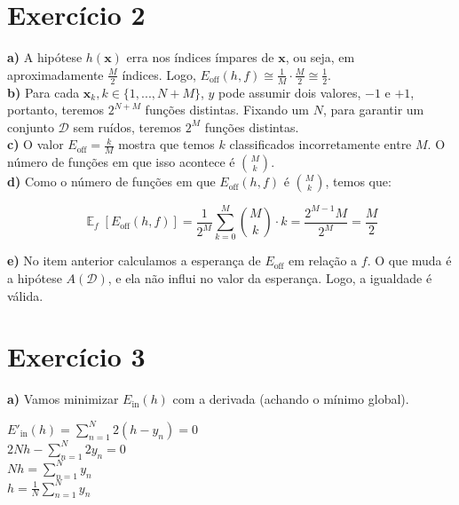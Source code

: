 \documentclass[12pt,letterpaper]{article}
\DeclareMathOperator{\expv}{\mathbb{E}}
\begin{document}
	\section*{Exercício 2}
	
	\textbf{a)} A hipótese $ h(\mathbf{x}) $ erra nos índices ímpares de $\mathbf{x}$, ou seja, em aproximadamente $ \frac{M}{2} $ índices. Logo, $ E_{\text{off}}(h,f) \cong \frac{1}{M}\cdot\frac{M}{2} \cong \frac{1}{2}$. \\
	
	\textbf{b)} Para cada $ \mathbf{x}_k, k \in \{1,..., N+M\}$, $ y $ pode assumir dois valores, $ -1 $ e $ +1 $, portanto, teremos $ 2^{N+M} $ funções distintas. Fixando um $N$, para garantir um conjunto $ \mathcal{D} $ sem ruídos, teremos $ 2^M $ funções distintas. \\
	
	\textbf{c)} O valor $ E_{\text{off}} = \frac{k}{M} $ mostra que temos $ k $ classificados incorretamente entre $ M $. O número de funções em que isso acontece é $ \binom{M}{k} $. \\
	
	\textbf{d)} Como o número de funções em que $ E_{\text{off}}(h,f) $ é $ \binom{M}{k} $, temos que: 
	
	\begin{equation*}
			\expv_f[E_{\text{off}}(h,f)] = \frac{1}{2^M} \sum_{k=0}^{M}\binom{M}{k} \cdot k = \frac{2^{M-1}M}{2^M} = \frac{M}{2}
	\end{equation*}
	
	\textbf{e)} No item anterior calculamos a esperança de $E_{\text{off}}$ em relação a $f$. O  que muda é a hipótese $ A(\mathcal{D}) $, e ela não influi no valor da esperança. Logo, a igualdade é válida.
	
	\section*{Exercício 3}
	
	\textbf{a)} Vamos minimizar $ E_{\text{in}}(h) $ com a derivada (achando o mínimo global).
	
	\begin{center} 
		$E'_{\text{in}}(h) = \sum_{n=1}^{N} 2(h-y_n) = 0$ \\
		$2Nh - \sum_{n=1}^{N} 2y_n = 0$ \\
		$Nh = \sum_{n=1}^{N} y_n$ \\
		$h = \frac{1}{N} \sum_{n=1}^{N} y_n$
	\end{center}
	
\end{document}
